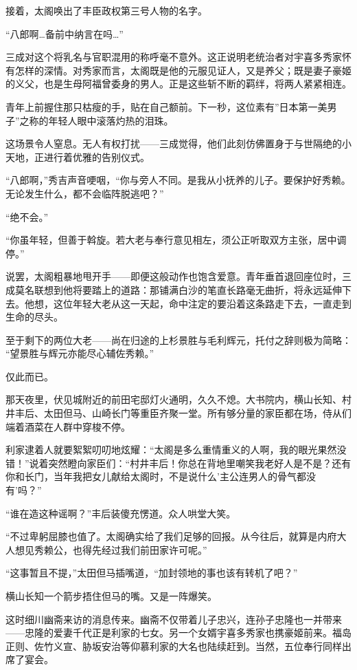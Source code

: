 \documentclass[
]{article}
\begin{document}
接着，太阁唤出了丰臣政权第三号人物的名字。

``八郎啊\ldots 备前中纳言在吗\ldots{}''

三成对这个将乳名与官职混用的称呼毫不意外。这正说明老统治者对宇喜多秀家怀有怎样的深情。对秀家而言，太阁既是他的元服见证人，又是养父；既是妻子豪姬的义父，也是生母阿福曾委身的男人。正是这些斩不断的羁绊，将两人紧紧相连。

青年上前握住那只枯瘦的手，贴在自己额前。下一秒，这位素有''日本第一美男子''之称的年轻人眼中滚落灼热的泪珠。

这场景令人窒息。无人有权打扰------三成觉得，他们此刻仿佛置身于与世隔绝的小天地，正进行着优雅的告别仪式。

``八郎啊，''秀吉声音哽咽，``你与旁人不同。是我从小抚养的儿子。要保护好秀赖。无论发生什么，都不会临阵脱逃吧？''

``绝不会。''

``你虽年轻，但善于斡旋。若大老与奉行意见相左，须公正听取双方主张，居中调停。''

说罢，太阁粗暴地甩开手------即便这般动作也饱含爱意。青年垂首退回座位时，三成莫名联想到他将要踏上的道路：那铺满白沙的笔直长路毫无曲折，将永远延伸下去。他想，这位年轻大老从这一天起，命中注定的要沿着这条路走下去，一直走到生命的尽头。

至于剩下的两位大老------尚在归途的上杉景胜与毛利辉元，托付之辞则极为简略：
``望景胜与辉元亦能尽心辅佐秀赖。''

仅此而已。

那天夜里，伏见城附近的前田宅邸灯火通明，久久不熄。大书院内，横山长知、村井丰后、太田但马、山崎长门等重臣齐聚一堂。所有够分量的家臣都在场，侍从们端着酒菜在人群中穿梭不停。

利家逮着人就要絮絮叨叨地炫耀：``太阁是多么重情重义的人啊，我的眼光果然没错！''说着突然瞪向家臣们：``村井丰后！你总在背地里嘲笑我老好人是不是？还有你和长门，当年我把女儿献给太阁时，不是说什么'主公连男人的骨气都没有'吗？''

``谁在造这种谣啊？''丰后装傻充愣道。众人哄堂大笑。

``不过卑躬屈膝也值了。太阁确实给了我们足够的回报。从今往后，就算是内府大人想见秀赖公，也得先经过我们前田家许可呢。''

``这事暂且不提，''太田但马插嘴道，``加封领地的事也该有转机了吧？''

横山长知一个箭步捂住但马的嘴。又是一阵爆笑。

这时细川幽斋来访的消息传来。幽斋不仅带着儿子忠兴，连孙子忠隆也一并带来------忠隆的爱妻千代正是利家的七女。另一个女婿宇喜多秀家也携豪姬前来。福岛正则、佐竹义宣、胁坂安治等仰慕利家的大名也陆续赶到。当然，五位奉行同样出席了宴会。
\end{document}
